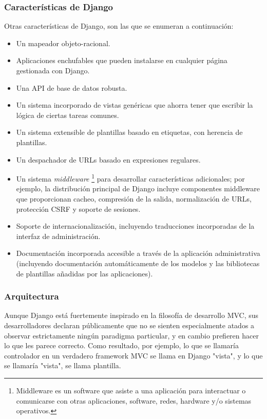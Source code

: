\subsubsection{Caracter\'isticas de Django}
Otras caracter\'isticas de Django, son las que se enumeran a continuaci\'on:
\begin{itemize}
\item Un mapeador objeto-racional.
\item Aplicaciones enchufables que pueden instalarse en cualquier p\'agina gestionada con Django.
\item Una API de base de datos robusta.
\item Un sistema incorporado de vistas gen\'ericas que ahorra tener que escribir la l\'ogica de ciertas tareas comunes.
\item Un sistema extensible de plantillas basado en etiquetas, con herencia de plantillas.
\item Un despachador de URLs basado en expresiones regulares.
\item Un sistema \textit{middleware} \footnote[1]{Middleware es un software que asiste a una aplicaci\'on para interactuar o comunicarse con otras aplicaciones, software, redes, hardware y/o sistemas operativos.} para desarrollar caracter\'isticas adicionales; por ejemplo, la distribuci\'on principal de Django incluye componentes middleware que proporcionan cacheo, compresi\'on de la salida, normalizaci\'on de URLs, protecci\'on CSRF y soporte de sesiones.
\item Soporte de internacionalizaci\'on, incluyendo traducciones incorporadas de la interfaz de administraci\'on.
\item Documentaci\'on incorporada accesible a trav\'es de la aplicaci\'on administrativa (incluyendo documentaci\'on autom\'aticamente de los modelos y las bibliotecas de plantillas a\~nadidas por las aplicaciones).
\end{itemize} 

\subsubsection{Arquitectura}
Aunque Django est\'a fuertemente inspirado en la filosof\'ia de desarrollo MVC, sus desarrolladores declaran p\'ublicamente que no se sienten especialmente atados a observar estrictamente ning\'un paradigma particular, y en cambio prefieren hacer lo que les parece correcto. Como resultado, por ejemplo, lo que se llamar\'ia controlador en un verdadero framework MVC se llama en Django "vista", y lo que se llamar\'ia "vista", se llama plantilla.\\

